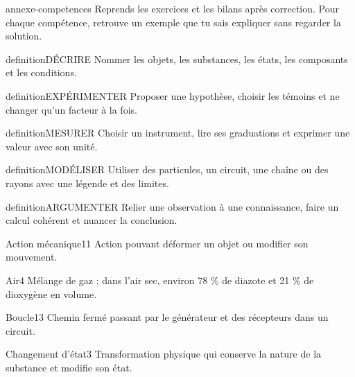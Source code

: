 \documentclass[12pt,twoside,openany]{book}
\begin{document}
\begin{pcFiche}{annexe-competences}
Reprends les exercices et les bilans après correction. Pour chaque compétence, retrouve un exemple que tu sais expliquer sans regarder la solution.\par
\begin{pcEncadre}{definition}{DÉCRIRE}
Nommer les objets, les substances, les états, les composants et les conditions.\par
\end{pcEncadre}
\begin{pcEncadre}{definition}{EXPÉRIMENTER}
Proposer une hypothèse, choisir les témoins et ne changer qu’un facteur à la fois.\par
\end{pcEncadre}
\begin{pcEncadre}{definition}{MESURER}
Choisir un instrument, lire ses graduations et exprimer une valeur avec son unité.\par
\end{pcEncadre}
\begin{pcEncadre}{definition}{MODÉLISER}
Utiliser des particules, un circuit, une chaîne ou des rayons avec une légende et des limites.\par
\end{pcEncadre}
\begin{pcEncadre}{definition}{ARGUMENTER}
Relier une observation à une connaissance, faire un calcul cohérent et nuancer la conclusion.\par
\end{pcEncadre}
\end{pcFiche}
\label{lexique}
\begin{pcLexique}{Action mécanique}{11}
Action pouvant déformer un objet ou modifier son mouvement.\par
\end{pcLexique}
\begin{pcLexique}{Air}{4}
Mélange de gaz ; dans l’air sec, environ 78 \% de diazote et 21 \% de dioxygène en volume.\par
\end{pcLexique}
\begin{pcLexique}{Boucle}{13}
Chemin fermé passant par le générateur et des récepteurs dans un circuit.\par
\end{pcLexique}
\begin{pcLexique}{Changement d’état}{3}
Transformation physique qui conserve la nature de la substance et modifie son état.\par
\end{pcLexique}
\end{document}
